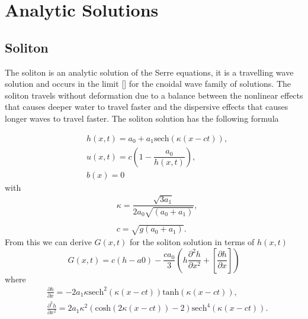 \section{Analytic Solutions}

\subsection{Soliton}
The soliton is an analytic solution of the Serre equations, it is a travelling wave solution and occurs in the limit [] for the cnoidal wave family of solutions. The soliton travels without deformation due to a balance between the nonlinear effects that causes deeper water to travel faster and the dispersive effects that causes longer waves to travel faster. The soliton solution has the following formula

\begin{subequations}
	\begin{align}
	&h(x,t) = a_0 + a_1\text{sech}\left(\kappa \left(x - ct\right)\right), \\
	&u(x,t) = c\left(1 - \dfrac{a_0}{h(x,t)}\right), \\
	&b(x) = 0
	\end{align}
	\label{eqn:Solitondefhub}
\end{subequations}
with
\begin{align*}
		&\kappa = \dfrac{\sqrt{3a_1}}{2 a_0\sqrt{\left(a_0 + a_1\right)}}, \\ \\
		&c = \sqrt{g(a_0 + a_1)}.
\end{align*}
From this we can derive $G(x,t)$ for the soliton solution in terms of $h(x,t)$
\begin{equation}
G(x,t) =c(h - a0) - \frac{ca_0}{3} \left(h\frac{\partial^2 h}{\partial x^2 } + \left[\frac{\partial h}{\partial x }\right] \right)
\label{eqn:SolitondefG}
\end{equation}
where
\begin{align*}
&\frac{\partial h}{\partial x } = -2 a_1 \kappa \text{sech}^2\left(\kappa \left(x - ct\right)\right) \text{tanh}\left(\kappa \left(x - ct\right)\right),\\
 &\frac{\partial^2 h}{\partial x^2 } =  2a_1 \kappa^2 \left(\text{cosh}\left(2\kappa \left(x - ct\right)\right) -2\right)\text{sech}^4\left(\kappa \left(x - ct\right)\right).
\end{align*}


